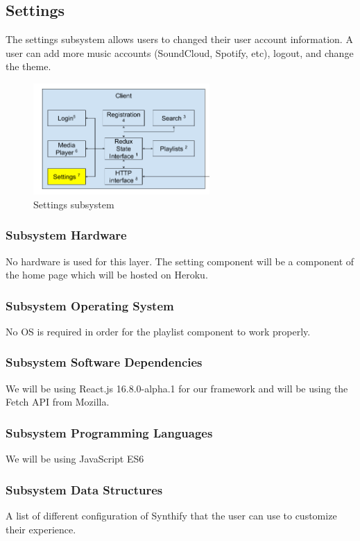 \subsection{Settings}
The settings subsystem allows users to changed their user account information. A user can add more music accounts (SoundCloud, Spotify, etc), logout, and change the theme.

\begin{figure}[h!]
	\centering
 	\includegraphics[width=0.60\textwidth]{images/client/client_settings.png}
 	\caption{Settings subsystem}
\end{figure}

\subsubsection{Subsystem Hardware}
No hardware is used for this layer. The setting component will be a component of the home page which will be hosted on Heroku.

\subsubsection{Subsystem Operating System}
No OS is required in order for the playlist component to work properly.

\subsubsection{Subsystem Software Dependencies}
We will be using React.js 16.8.0-alpha.1 for our framework and will be using the Fetch API from Mozilla.

\subsubsection{Subsystem Programming Languages}
We will be using JavaScript ES6

\subsubsection{Subsystem Data Structures}
A list of different configuration of Synthify that the user can use to customize their experience.

\newpage
